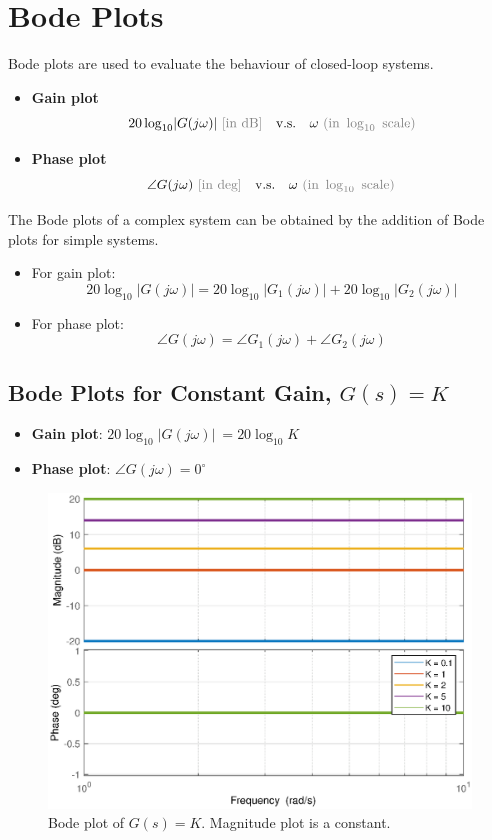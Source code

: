 \newpage
\section{Bode Plots}

Bode plots are used to evaluate the behaviour of closed-loop systems.
\begin{itemize}
\item \textbf{Gain plot} \[20\log_{10}\lvert G(j\omega) \rvert \ \text{\textcolor{gray}{[in dB]}}\quad \text{v.s.} \quad \omega \ \textcolor{gray}{(\text{in } \log_{10} \ \text{scale})}\]
\item \textbf{Phase plot} \[\angle G(j\omega) \ \text{\textcolor{gray}{[in deg]}} \quad \text{v.s.} \quad \omega \ \textcolor{gray}{(\text{in } \log_{10} \ \text{scale})}  \]
\end{itemize}
The Bode plots of a complex system can be obtained by the addition of Bode plots for simple systems.
\begin{itemize}
\item For gain plot:
\[20\log_{10}\lvert G(j\omega)\rvert  = 20\log_{10}\lvert G_{1}(j\omega)\rvert+20\log_{10}\lvert G_{2}(j\omega)\rvert \]
\item For phase plot:
\[\angle G(j\omega) = \angle G_{1}(j\omega)+\angle G_{2}(j\omega) \]
\end{itemize}

\subsection{Bode Plots for Constant Gain, $G(s) = K$}
\begin{itemize}
\item \textbf{Gain plot}: $20\log_{10}\lvert G(j\omega) \rvert \ = 20\log_{10}K$ 
\item \textbf{Phase plot}: $\angle G(j\omega) = 0^{\circ}$
\end{itemize}
\begin{figure}[H] 
    \centering 
    \includegraphics[width=.7\textwidth]{images/bode5.eps}
    \caption{Bode plot of $G(s) = K$. Magnitude plot is a constant.}
\end{figure}

